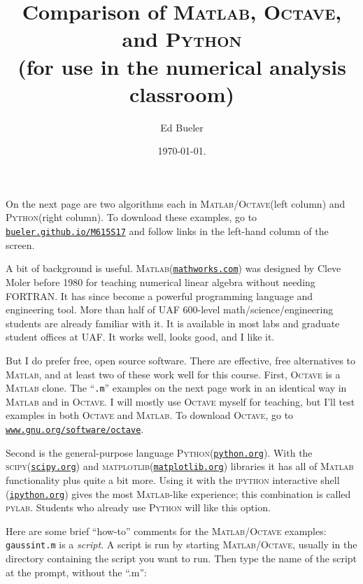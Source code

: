 \documentclass[11pt]{amsart}
\newcommand{\Matlab}{\textsc{Matlab}\xspace}
\newcommand{\Octave}{\textsc{Octave}\xspace}
\newcommand{\Python}{\textsc{Python}\xspace}
\newcommand{\pylab}{\textsc{pylab}\xspace}
\newcommand{\scipy}{\textsc{scipy}\xspace}
\newcommand{\matplotlib}{\textsc{matplotlib}\xspace}
\begin{document}
\title{Comparison of \textsc{Matlab}, \textsc{Octave}, and \textsc{Python} \\ (for use in the numerical analysis classroom)}

\author{Ed Bueler}

\date{\today.}

\maketitle
\normalsize
\thispagestyle{empty}

\newcommand{\hrf}[2]{\href{#1}{\texttt{#2}}}

On the next page are two algorithms each in \Matlab/\Octave (left column) and \Python (right column).  To download these examples, go to \hrf{http://bueler.github.io/M615S17}{bueler.github.io/M615S17} and follow links in the left-hand column of the screen.

A bit of background is useful.  \Matlab (\hrf{http://www.mathworks.com/}{mathworks.com}) was designed by Cleve Moler before 1980 for teaching numerical linear algebra without needing FORTRAN.  It has since become a powerful programming language and engineering tool.  More than half of UAF 600-level math/science/engineering students are already familiar with it.  It is available in most labs and graduate student offices at UAF.  It works well, looks good, and I like it.

But I do prefer free, open source software.  There are effective, free alternatives to \Matlab, and at least two of these work well for this course.  First, \Octave is a \Matlab clone.  The ``\texttt{.m}'' examples on the next page work in an identical way in \Matlab and in \Octave.  I will mostly use \Octave myself for teaching, but I'll test examples in both \Octave and \Matlab.  To download \Octave, go to 
\hrf{http://www.gnu.org/software/octave/}{www.gnu.org/software/octave}.

Second is the general-purpose language \Python (\hrf{http://python.org/}{python.org}).  With the \scipy (\hrf{http://www.scipy.org/}{scipy.org}) and \matplotlib (\hrf{http://matplotlib.org/}{matplotlib.org}) libraries it has all of \Matlab functionality plus quite a bit more.  Using it with the \textsc{ipython} interactive shell (\hrf{http://ipython.org/}{ipython.org}) gives the most \Matlab-like experience; this combination is called \pylab.  Students who already use \Python will like this option.

Here are some brief ``how-to'' comments for the \Matlab/\Octave examples: \texttt{gaussint.m} is a \emph{script}.  A script is run by starting \Matlab/\Octave, usually in the directory containing the script you want to run.  Then type the name of the script at the prompt, without the ``.m'':
\end{document}
